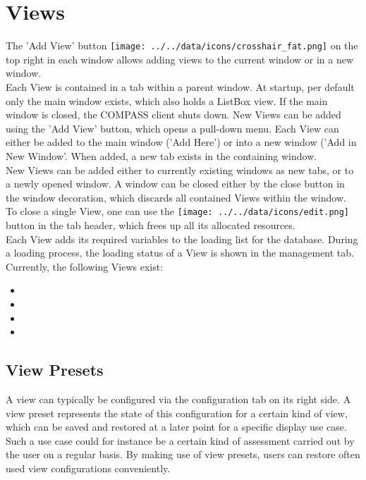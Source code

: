 \section{Views}
The 'Add View' button \texttt{[image: ../../data/icons/crosshair\_fat.png]} on the top right in each window allows adding views to the current window or in a new window. \\

Each View is contained in a tab within a parent window.  At startup, per default only the main window exists, which also holds
a ListBox view. If the main window is closed, the COMPASS client shuts down. New Views can be added using the 'Add View' button, which opens a pull-down menu. Each View can either be added to the main window ('Add Here') or into a new window ('Add in New Window'. When added, a new tab exists in the containing window. \\

New Views can be added either to currently existing windows as new tabs, or to a newly opened window. A window can be closed either by the close button in the window decoration, which discards all contained Views within the window.  \\

To close a single View, one can use the \texttt{[image: ../../data/icons/edit.png]} button in the tab header, which frees up all its allocated resources. \\

Each View adds its required variables to the loading list for the database. During a loading process, the loading status  of a View is shown in the management tab.\\

Currently, the following Views exist:
\begin{itemize}
 \item {}
 \item {}
 \item {}
 \item {}
\end{itemize}

\subsection{View Presets}

A view can typically be configured via the configuration tab on its right side.
A view preset represents the state of this configuration for a certain kind of view,
which can be saved and restored at a later point for a specific display use case. 
Such a use case could for instance be a certain kind of assessment carried out by the user
on a regular basis. By making use of view presets, users can restore often used view configurations conveniently. \\

